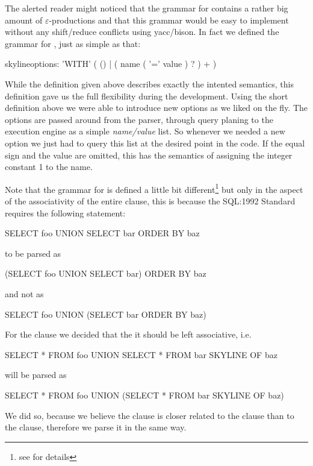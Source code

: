 The alerted reader might noticed that the grammar for 
contains a rather big amount of $\varepsilon$-productions and that this
grammar would be easy to implement without any shift/reduce conflicts
using yacc/bison. In fact we defined the grammar for
, just as simple as that:

\begin{rail}
skylineoptions:
    'WITH' ( () | ( name ( '=' value ) ? ) + )
\end{rail}

While the definition given above describes exactly the intented
semantics, this definition gave us the full flexibility during the
development. Using the short definition above we were able to
introduce new options as we liked on the fly.  The options are passed
around from the parser, through query planing to the execution engine
as a simple \emph{name/value} list.  So whenever we needed a new
option we just had to query this list at the desired point in the
code. If the equal sign and the value are omitted, this has the
semantics of assigning the integer constant 1 to the name.

Note that the grammar for  is defined
a little bit different\footnote{see 
for details} but only in the aspect of the associativity of the entire
 clause, this is because the SQL:1992 Standard
\citep{SQL92} requires the following statement:

\begin{sql}SELECT foo UNION SELECT bar ORDER BY baz\end{sql}
to be parsed as
\begin{sql}(SELECT foo UNION SELECT bar) ORDER BY baz\end{sql}
and not as
\begin{sql}SELECT foo UNION (SELECT bar ORDER BY baz)\end{sql}

\noindent{}For the  clause we decided that the it should be left
associative, i.e. 
\begin{sql}SELECT * FROM foo UNION SELECT * FROM bar SKYLINE OF baz\end{sql}
will be parsed as 
\begin{sql}SELECT * FROM foo UNION (SELECT * FROM bar SKYLINE OF baz)\end{sql}

\noindent{}We did so, because we believe the  clause is closer
related to the  clause than to the 
clause, therefore we parse it in the same way.

